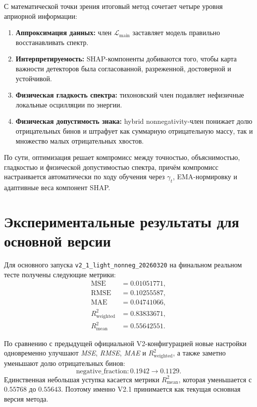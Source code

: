 \documentclass[11pt]{article}
\begin{document}
С математической точки зрения итоговый метод сочетает четыре уровня априорной информации:
\begin{enumerate}
    \item \textbf{Аппроксимация данных:} член $\mathcal{L}_{\mathrm{main}}$ заставляет модель правильно восстанавливать спектр.
    \item \textbf{Интерпретируемость:} SHAP-компоненты добиваются того, чтобы карта важности детекторов была согласованной, разреженной, достоверной и устойчивой.
    \item \textbf{Физическая гладкость спектра:} тихоновский член подавляет нефизичные локальные осцилляции по энергии.
    \item \textbf{Физическая допустимость знака:} hybrid nonnegativity-член понижает долю отрицательных бинов и штрафует как суммарную отрицательную массу, так и множество малых отрицательных хвостов.
\end{enumerate}

По сути, оптимизация решает компромисс между точностью, объяснимостью, гладкостью и физической допустимостью спектра, причём компромисс настраивается автоматически по ходу обучения через $\gamma_t$, EMA-нормировку и адаптивные веса компонент SHAP.

\section{Экспериментальные результаты для основной версии}

Для основного запуска \texttt{v2\_1\_light\_nonneg\_20260320} на финальном реальном тесте получены следующие метрики:
\begin{align}
    \operatorname{MSE} &= 0.01051771,\\
    \operatorname{RMSE} &= 0.10255587,\\
    \operatorname{MAE} &= 0.04741066,\\
    R^2_{\mathrm{weighted}} &= 0.83833671,\\
    R^2_{\mathrm{mean}} &= 0.55642551.
\end{align}

По сравнению с предыдущей официальной V2-конфигурацией новые настройки одновременно улучшают \textit{MSE}, \textit{RMSE}, \textit{MAE} и $R^2_{\mathrm{weighted}}$, а также заметно уменьшают долю отрицательных бинов:
\begin{equation}
\mathrm{negative\_fraction}: 0.1942 \rightarrow 0.1129.
\end{equation}
Единственная небольшая уступка касается метрики $R^2_{\mathrm{mean}}$, которая уменьшается с $0.55768$ до $0.55643$. Поэтому именно V2.1 принимается как текущая основная версия метода.
\end{document}
